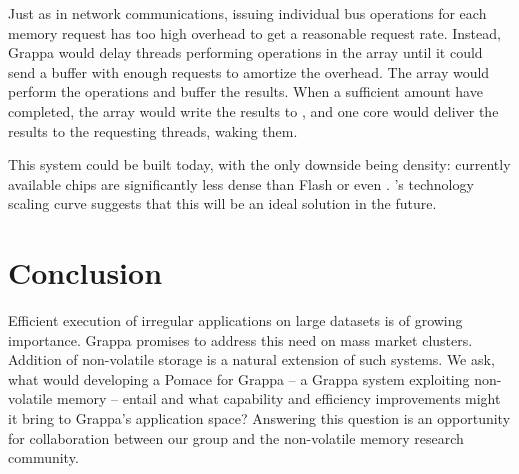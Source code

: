 Just as in network communications, issuing individual  bus
operations for each memory request has too high overhead to get a
reasonable request rate.  Instead, Grappa would delay threads
performing operations in the  array until it could send a buffer
with enough requests to amortize the overhead. The  array would
perform the operations and buffer the results. When a sufficient
amount have completed, the  array would write the results to \@,
and one core would deliver the results to the requesting threads,
waking them.


This system could be built today, with the only downside being
density: currently available  chips are significantly less dense
than Flash or even \@. 's technology scaling curve suggests that
this will be an ideal solution in the future.

\section{Conclusion}
Efficient execution of irregular applications on large datasets is of
growing importance.  Grappa promises to address this need on mass
market clusters.  Addition of non-volatile storage is a natural
extension of such systems.  We ask, what would developing a Pomace for
Grappa -- a Grappa system exploiting non-volatile memory -- entail and
what capability and efficiency improvements might it bring to Grappa's
application space?  Answering this question is an opportunity for
collaboration between our group and the non-volatile memory research community.


\begin{spacing}{0.8}


\end{spacing}





